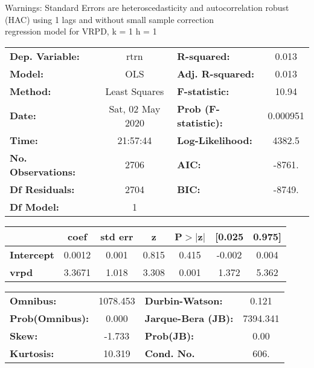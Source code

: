 Warnings: \newline
 [1] Standard Errors are heteroscedasticity and autocorrelation robust (HAC) using 1 lags and without small sample correction\\ 

regression model for VRPD, k = 1 h = 1\begin{center}
\begin{tabular}{lclc}
\toprule
\textbf{Dep. Variable:}    &       rtrn       & \textbf{  R-squared:         } &     0.013   \\
\textbf{Model:}            &       OLS        & \textbf{  Adj. R-squared:    } &     0.013   \\
\textbf{Method:}           &  Least Squares   & \textbf{  F-statistic:       } &     10.94   \\
\textbf{Date:}             & Sat, 02 May 2020 & \textbf{  Prob (F-statistic):} &  0.000951   \\
\textbf{Time:}             &     21:57:44     & \textbf{  Log-Likelihood:    } &    4382.5   \\
\textbf{No. Observations:} &        2706      & \textbf{  AIC:               } &    -8761.   \\
\textbf{Df Residuals:}     &        2704      & \textbf{  BIC:               } &    -8749.   \\
\textbf{Df Model:}         &           1      & \textbf{                     } &             \\
\bottomrule
\end{tabular}
\begin{tabular}{lcccccc}
                   & \textbf{coef} & \textbf{std err} & \textbf{z} & \textbf{P$> |$z$|$} & \textbf{[0.025} & \textbf{0.975]}  \\
\midrule
\textbf{Intercept} &       0.0012  &        0.001     &     0.815  &         0.415        &       -0.002    &        0.004     \\
\textbf{vrpd}      &       3.3671  &        1.018     &     3.308  &         0.001        &        1.372    &        5.362     \\
\bottomrule
\end{tabular}
\begin{tabular}{lclc}
\textbf{Omnibus:}       & 1078.453 & \textbf{  Durbin-Watson:     } &    0.121  \\
\textbf{Prob(Omnibus):} &   0.000  & \textbf{  Jarque-Bera (JB):  } & 7394.341  \\
\textbf{Skew:}          &  -1.733  & \textbf{  Prob(JB):          } &     0.00  \\
\textbf{Kurtosis:}      &  10.319  & \textbf{  Cond. No.          } &     606.  \\
\bottomrule
\end{tabular}
\end{center}

